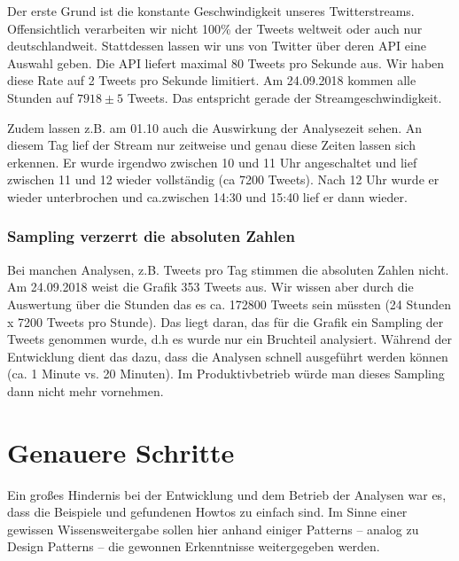 Der erste Grund ist die konstante Geschwindigkeit unseres
Twitterstreams. Offensichtlich verarbeiten wir nicht 100\% der Tweets
weltweit oder auch nur deutschlandweit. Stattdessen lassen wir uns von
Twitter über deren API eine Auswahl geben. Die API liefert maximal 80
Tweets pro Sekunde aus. Wir haben diese Rate auf 2 Tweets pro Sekunde
limitiert. Am 24.09.2018 kommen alle
Stunden auf $7918 \pm 5$ Tweets. Das entspricht gerade
der Streamgeschwindigkeit.

Zudem lassen z.B. am 01.10 auch die Auswirkung der Analysezeit sehen. An
diesem Tag lief der Stream nur zeitweise und genau diese Zeiten lassen
sich erkennen. Er wurde irgendwo zwischen 10 und 11 Uhr angeschaltet
und lief zwischen 11 und 12 wieder vollständig (ca 7200 Tweets). Nach
12 Uhr wurde er wieder unterbrochen und ca.zwischen 14:30 und 15:40
lief er dann wieder. 

\subsubsection{Sampling verzerrt die absoluten
Zahlen}
Bei manchen Analysen, z.B. Tweets pro Tag stimmen die absoluten Zahlen
nicht. Am 24.09.2018 weist die Grafik 353 Tweets aus. Wir wissen aber
durch die Auswertung über die Stunden das es ca. 172800 Tweets sein
müssten (24 Stunden x 7200 Tweets pro Stunde). Das liegt daran, das
für die Grafik ein Sampling der Tweets genommen wurde, d.h es wurde nur
ein Bruchteil analysiert. Während der Entwicklung dient das dazu, dass
die Analysen schnell ausgeführt werden können (ca. 1 Minute vs. 20
Minuten). Im Produktivbetrieb würde man dieses Sampling dann nicht mehr
vornehmen.

\section{Genauere Schritte}
Ein großes Hindernis bei der Entwicklung und dem Betrieb der Analysen
war es, dass die Beispiele und gefundenen Howtos zu einfach sind. Im
Sinne einer gewissen Wissensweitergabe sollen hier anhand einiger
Patterns – analog zu Design Patterns – die gewonnen Erkenntnisse
weitergegeben werden. 

